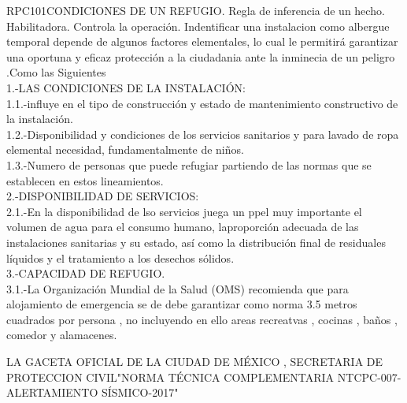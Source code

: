 \begin{BusinessRule}{RPC101}{CONDICIONES DE UN REFUGIO.}{
		Regla de inferencia de un hecho.
	}{
		Habilitadora. 
	}{
		Controla la operación. %
	}
	\BRItem[Descripción:] Indentificar una instalacion como albergue temporal depende de algunos factores elementales, lo cual le permitirá garantizar una oportuna y eficaz protección a la ciudadania ante la inminecia de un peligro .Como las Siguientes\\1.-LAS CONDICIONES DE LA INSTALACIÓN: \\1.1.-influye en el tipo de construcción y estado de mantenimiento constructivo de la instalación.\\1.2.-Disponibilidad y condiciones de los servicios sanitarios y para lavado de ropa elemental necesidad, fundamentalmente de niños.\\1.3.-Numero de personas que puede refugiar partiendo de las normas que se establecen en estos lineamientos. \\2.-DISPONIBILIDAD DE SERVICIOS:\\2.1.-En la disponibilidad de lso servicios juega un ppel muy importante el volumen de agua para el consumo humano, laproporción adecuada de las instalaciones sanitarias y su estado, así como la distribución final de residuales líquidos y el tratamiento a los desechos sólidos. \\3.-CAPACIDAD DE REFUGIO.\\3.1.-La Organización Mundial de la Salud (OMS) recomienda que para alojamiento de emergencia se de debe garantizar como norma 3.5 metros cuadrados por persona , no incluyendo en ello areas recreatvas , cocinas , baños , comedor y alamacenes.
	
	
	 LA GACETA OFICIAL DE LA CIUDAD DE MÉXICO , SECRETARIA DE PROTECCION CIVIL"NORMA TÉCNICA COMPLEMENTARIA NTCPC-007-ALERTAMIENTO SÍSMICO-2017"
\end{BusinessRule}